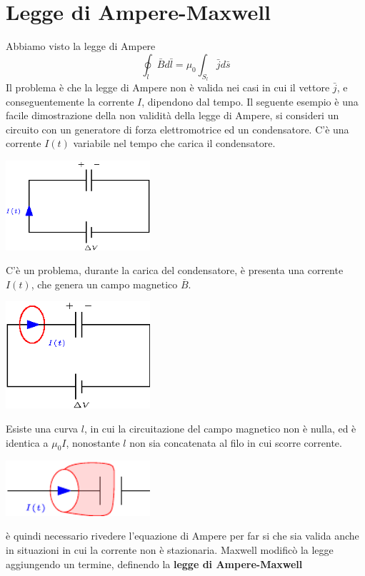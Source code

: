 \documentclass[10pt, letterpaper]{report}
\begin{document}
\section{Legge di Ampere-Maxwell}
Abbiamo visto la legge di Ampere  
$$ \oint_l \bar B d\bar l = \mu_0\int_{S_l}\bar j d\bar s$$
Il problema è che la legge di Ampere non è valida nei casi in cui il vettore $\bar j$, e conseguentemente la corrente $I$, dipendono dal tempo. \acc 
Il seguente esempio è una facile dimostrazione della non validità della legge di Ampere, si consideri un circuito con un generatore di forza elettromotrice ed un condensatore. C'è una corrente $I(t)$ variabile nel tempo che carica il condensatore.
\begin{center}
    \includegraphics[width=0.4\textwidth]{images/ampereMax1.eps}
\end{center}
C'è un problema, durante la carica del condensatore, è presenta una corrente $I(t)$, che genera un campo magnetico $\bar B$.
\begin{center}
    \includegraphics[width=0.4\textwidth]{images/ampereMax2.eps}
\end{center}
Esiste una curva $l$, in cui la circuitazione del campo magnetico non è nulla, ed è identica a $\mu_0I$, nonostante $l$ non sia concatenata al filo in cui scorre corrente.\begin{center}
    \includegraphics[width=0.4\textwidth]{images/ampereMax3.pdf}
\end{center}
è quindi necessario rivedere l'equazione di Ampere per far si  che sia valida anche in situazioni in cui la corrente non è stazionaria. Maxwell modificò la legge aggiungendo un termine, definendo la \textbf{legge di Ampere-Maxwell}
\end{document}

